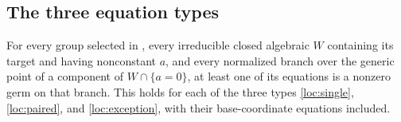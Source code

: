 \subsection{The three equation types}

\begin{proposition}
\label{nid:nonidentity}
For every group selected in , every irreducible closed
algebraic $W$ containing its target and having nonconstant $a$, and every
normalized branch over the generic point of a component of
$W\cap\{a=0\}$, at least one of its equations is a nonzero germ on that
branch.  This holds for each of the three types
\eqref{loc:single}, \eqref{loc:paired}, and \eqref{loc:exception}, with
their base-coordinate equations included.
\end{proposition}

